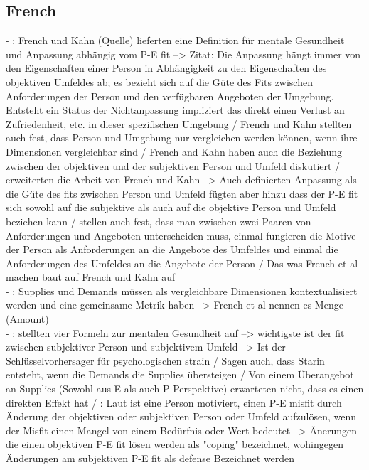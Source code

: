\subsection{French}
\label{ch:notizen:jobStress:french}
- \cite[S. 18]{edwards:2008}: French und Kahn (Quelle) lieferten eine Definition für mentale Gesundheit und Anpassung abhängig vom P-E fit --> Zitat: Die Anpassung hängt immer von den Eigenschaften einer Person in Abhängigkeit zu den Eigenschaften des objektiven Umfeldes ab; es bezieht sich auf die Güte des Fits zwischen Anforderungen der Person und den verfügbaren Angeboten der Umgebung. Entsteht ein Status der Nichtanpassung impliziert das direkt einen Verlust an Zufriedenheit, etc. in dieser spezifischen Umgebung / French und Kahn stellten auch fest, dass Person und Umgebung nur vergleichen werden können, wenn ihre Dimensionen vergleichbar sind  / French and Kahn haben auch die Beziehung zwischen der objektiven und der subjektiven Person und Umfeld diskutiert / \textcite{copingAndAdaption:1974} erweiterten die Arbeit von French und Kahn --> Auch \cite{copingAndAdaption:1974} definierten Anpassung als die Güte des fits zwischen Person und Umfeld fügten aber hinzu dass der P-E fit sich sowohl auf die subjektive als auch auf die objektive Person und Umfeld beziehen kann / \textcite{copingAndAdaption:1974} stellen auch fest, dass man zwischen zwei Paaren von Anforderungen und Angeboten unterscheiden muss, einmal fungieren die Motive der Person als Anforderungen an die Angebote des Umfeldes und einmal die Anforderungen des Umfeldes an die Angebote der Person / Das was French et al machen baut auf French und Kahn auf \\
- \cite[S. 18f.]{edwards:2008}: Supplies und Demands müssen als vergleichbare Dimensionen kontextualisiert werden und eine gemeinsame Metrik haben --> French et al nennen es Menge (Amount) \\
- \cite[S. 19]{edwards:2008}: \textcite{copingAndAdaption:1974} stellten vier Formeln zur mentalen Gesundheit auf --> wichtigste ist der fit zwischen subjektiver Person und subjektivem Umfeld --> Ist der Schlüsselvorhersager für psychologischen strain / Sagen auch, dass Starin entsteht, wenn die Demands die Supplies übersteigen / Von einem Überangebot an Supplies (Sowohl aus E als auch P Perspektive) erwarteten \cite[S. 319]{copingAndAdaption:1974} nicht, dass es einen direkten Effekt hat / \cite[S. 19f.]{edwards:2008}: Laut \textcite[S. 330f.]{copingAndAdaption:1974} ist eine Person motiviert, einen P-E misfit durch Änderung der objektiven oder subjektiven Person oder Umfeld aufzulösen, wenn der Misfit einen Mangel von einem Bedürfnis oder Wert bedeutet --> Änerungen die einen objektiven P-E fit lösen werden als "coping" bezeichnet, wohingegen Änderungen am subjektiven P-E fit als defense Bezeichnet werden \\
